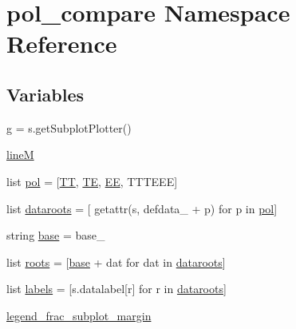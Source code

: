 \hypertarget{namespacepol__compare}{}\section{pol\+\_\+compare Namespace Reference}
\label{namespacepol__compare}
\subsection*{Variables}
\begin{DoxyCompactItemize}
\item 
\mbox{\hyperlink{namespacepol__compare_a28ab2c9bc9cd3956bde4630e1ef3ad60}{g}} = s.\+get\+Subplot\+Plotter()
\item 
\mbox{\hyperlink{namespacepol__compare_aa036b71441243e7146c8b2a0deaa3693}{lineM}}
\item 
list \mbox{\hyperlink{namespacepol__compare_ac502641a8be0e221c76c18a633e1184e}{pol}} = \mbox{[}\textquotesingle{}\mbox{\hyperlink{plotTT_8m_a2f803268a6367d0943978eb5f84cc62e}{TT}}\textquotesingle{}, \textquotesingle{}\mbox{\hyperlink{plotdiffs_8m_a1a5b2ac8f21dd2ac3d0605ff0b067ec4}{TE}}\textquotesingle{}, \textquotesingle{}\mbox{\hyperlink{plotdiffs_8m_a6f96ba8525cc2f838c7d8b6888a1481b}{EE}}\textquotesingle{}, \textquotesingle{}T\+T\+T\+E\+EE\textquotesingle{}\mbox{]}
\item 
list \mbox{\hyperlink{namespacepol__compare_a51c9574c50b405f7b051e08d93459da2}{dataroots}} = \mbox{[} getattr(s, \textquotesingle{}defdata\+\_\+\textquotesingle{} + p) for p in \mbox{\hyperlink{namespacepol__compare_ac502641a8be0e221c76c18a633e1184e}{pol}}\mbox{]}
\item 
string \mbox{\hyperlink{namespacepol__compare_a8ff59771278ec8aef743aaecde372138}{base}} = \textquotesingle{}base\+\_\+\textquotesingle{}
\item 
list \mbox{\hyperlink{namespacepol__compare_aa10296f428d464dc29b6a291e8282386}{roots}} = \mbox{[}\mbox{\hyperlink{namespacepol__compare_a8ff59771278ec8aef743aaecde372138}{base}} + dat for dat in \mbox{\hyperlink{namespacepol__compare_a51c9574c50b405f7b051e08d93459da2}{dataroots}}\mbox{]}
\item 
list \mbox{\hyperlink{namespacepol__compare_a3ba729d96cd71c8b4e0df18323a5a246}{labels}} = \mbox{[}s.\+datalabel\mbox{[}r\mbox{]} for r in \mbox{\hyperlink{namespacepol__compare_a51c9574c50b405f7b051e08d93459da2}{dataroots}}\mbox{]}
\item 
\mbox{\hyperlink{namespacepol__compare_a2b062884668db6b309e0e238d6aa2cbc}{legend\+\_\+frac\+\_\+subplot\+\_\+margin}}

\end{DoxyCompactItemize}

